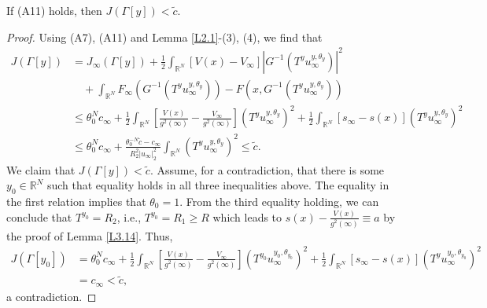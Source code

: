 \documentclass[reqno]{amsart}
\begin{document}
\begin{lemma}\label{L3.18}
 If {\rm (A11) } holds, then $J(\Gamma[y])<\tilde{c}$.
\end{lemma}

\begin{proof} 
Using (A7), (A11) and Lemma \ref{L2.1}-(3), (4), we find that
\begin{align*}
J(\Gamma[y])
&=J_\infty(\Gamma[y])+\frac{1}{2}\int_{\mathbb{R}^N}[V(x)-V_\infty]|G^{-1}(T^yu_\infty^{y,\theta_y})|^2\\
&\quad +\int_{\mathbb{R}^N}F_\infty(G^{-1}(T^yu_\infty^{y,\theta_y}))-F(x,G^{-1}(T^yu_\infty^{y,\theta_y}))\\
&\leq\theta_0^{N}c_\infty+\frac{1}{2}\int_{\mathbb{R}^N}[\frac{V(x)}{g^2(\infty)}-\frac{V_\infty}{g^2(\infty)}](T^yu_\infty^{y,\theta_y})^2
  +\frac{1}{2}\int_{\mathbb{R}^N}[s_\infty-s(x)](T^yu_\infty^{y,\theta_y})^2\\
&\leq\theta_0^{N}c_\infty+\frac{\theta^{-N}_0\tilde{c}-c_\infty}{R^2_2|u_\infty|^2_2}\int_{\mathbb{R}^N}(T^yu_\infty^{y,\theta_y})^2\leq\tilde{c}.
\end{align*}
We claim that $J(\Gamma[y])<\tilde{c}$. Assume, for a contradiction, that there is some 
$y_0\in{\mathbb{R}^N}$ such that equality holds in all three inequalities above. 
The equality in the first relation implies that $\theta_0=1$. From the third equality holding, 
we can conclude that $T^{y_0}=R_2$, i.e., $T^{y_0}=R_1\geq R$ which leads to 
$s(x)-\frac{V(x)}{g^2(\infty)}\equiv a$ by the proof of Lemma \ref{L3.14}. Thus,
\begin{align*}
J(\Gamma[{y_0}])
&=\theta_0^{N}c_\infty+\frac{1}{2}\int_{\mathbb{R}^N}[\frac{V(x)}{g^2(\infty)}-\frac{V_\infty}{g^2(\infty)}](T^{y_0}u_\infty^{{y_0},\theta_{y_0}})^2
 +\frac{1}{2}\int_{\mathbb{R}^N}[s_\infty-s(x)](T^yu_\infty^{{y_0},\theta_{y_0}})^2\\
&=c_\infty<\tilde{c},
\end{align*} 
a contradiction.
\end{proof}
\end{document}
